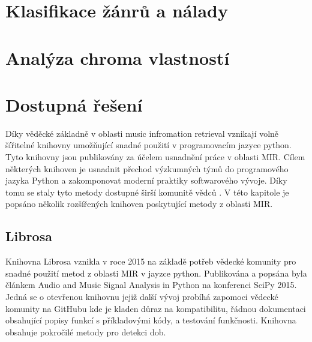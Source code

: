 


\section{Klasifikace žánrů a nálady} \label{sec:Klasifikace_zanru}


\section{Analýza chroma vlastností} \label{sec:Chroma_vektory}

\section{Dostupná řešení} \label{sec:Dostupna_reseni}
    Díky věděcké základně v oblasti music infromation retrieval vznikají volně šířitelné knihovny umožňující snadné použití v programovacím jazyce python. Tyto knihovny jsou publikovány za účelem usnadnění práce v oblasti \acs{MIR}. Cílem některých knihoven je usnadnit přechod výzkumných týmů do programového jazyka Python a zakomponovat moderní praktiky softwarového vývoje. Díky tomu se staly tyto metody dostupné širší komunitě vědců \cite{Librosa}. V této kapitole je popsáno několik rozšířených knihoven poskytující metody z oblasti \acs{MIR}.

\subsection{Librosa} \label{sec:Librosa}
    Knihovna Librosa vznikla v roce 2015 na základě potřeb vědecké komunity pro snadné použití metod z oblasti \acs{MIR} v jayzce python.
    Publikována a popsána byla článkem Audio and Music Signal Analysis in Python \cite{Librosa} na konferenci SciPy 2015.
    Jedná se o otevřenou knihovnu jejiž další vývoj probíhá zapomoci vědecké komunity na GitHubu kde je kladen důraz na kompatibilitu, řádnou dokumentaci obsahující popisy funkcí s příkladovými kódy, a testování funkčnosti. Knihovna obsahuje pokročilé metody pro detekci dob.

